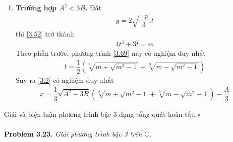 \documentclass[a4paper,oneside]{book}
\numberwithin{equation}{chapter}
\begin{document}
\begin{enumerate}
\begin{itemize}
\begin{align}
\begin{array}{l}
\end{array} \right.
\end{align}
\item \textbf{Trường hợp $\left| m \right| > 1$.} Đặt 
\begin{align}
m = \dfrac{1}{2}\left( {{d^3} + \dfrac{1}{{{d^3}}}} \right)
\end{align}
thì \eqref{3.57} có nghiệm duy nhất
\begin{align}
t = \dfrac{1}{2}\left( {d + \dfrac{1}{d}} \right) = \dfrac{1}{2}\left( {\sqrt {m + \sqrt {{m^2} + 1} }  + \sqrt {m - \sqrt {{m^2} + 1} } } \right)
\end{align}
Suy ra \eqref{3.2} có nghiệm duy nhất là
\begin{align}
x = \dfrac{1}{3}\sqrt {{A^2} - 3B} \left( {\sqrt {m + \sqrt {{m^2} + 1} }  + \sqrt {m - \sqrt {{m^2} + 1} } } \right) - \dfrac{A}{3}
\end{align}
trong đó 
\begin{align}
m = \dfrac{{3\sqrt 3 }}{2}\dfrac{{\sqrt { - {A^3} + 9AB + 27C} }}{{{{\left( {{A^2} - 3B} \right)}^{\dfrac{3}{2}}}}}
\end{align}
\end{itemize}
\item \textbf{Trường hợp ${A^2} < 3B$.} Đặt 
\begin{align}
y = 2\sqrt {\dfrac{{ - p}}{3}} .t
\end{align}
thì \eqref{3.52} trở thành 
\begin{align}
\label{3.69}
4{t^3} + 3t = m
\end{align}
Theo phần trước, phương trình \eqref{3.69} này có nghiệm duy nhất
\begin{align}
t = \dfrac{1}{2}\left( {\sqrt[3]{{m + \sqrt {{m^2} - 1} }} + \sqrt[3]{{m - \sqrt {{m^2} - 1} }}} \right)
\end{align}
Suy ra \eqref{3.2} có nghiệm duy nhất 
\begin{align}
x = \dfrac{1}{3}\sqrt {{A^2} - 3B} \left( {\sqrt[3]{{m + \sqrt {{m^2} - 1} }} + \sqrt[3]{{m - \sqrt {{m^2} - 1} }}} \right) - \dfrac{A}{3}
\end{align}
\end{enumerate}
Giải và biện luận phương trình bậc 3 dạng tổng quát hoàn tất. \hfill $\square$\\
\\
\textbf{Problem 3.23.} \textit{Giải phương trình bậc 3 trên $\mathbb{C}$.}
\end{document}
